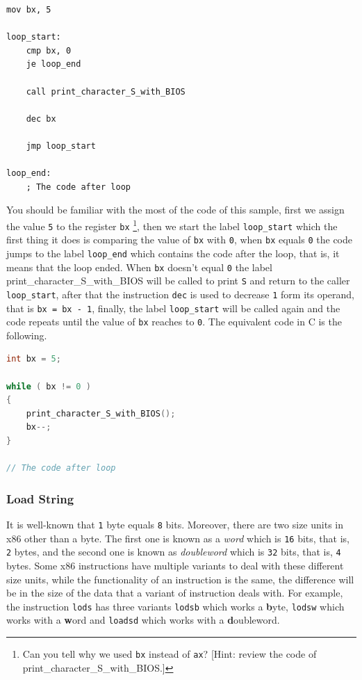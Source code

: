 \begin{lstlisting}
mov bx, 5

loop_start:
    cmp bx, 0
    je loop_end
    
    call print_character_S_with_BIOS
    
    dec bx
    
    jmp loop_start
    
loop_end:
    ; The code after loop
\end{lstlisting}

You should be familiar with the most of the code of this sample, first
we assign the value \lstinline!5! to the register \lstinline!bx!
\footnote{Can you tell why we used \lstinline!bx! instead of
  \lstinline!ax!? {[}Hint: review the code of
  print\_character\_S\_with\_BIOS.{]}}, then we start the label
\lstinline!loop_start! which the first thing it does is comparing the
value of \lstinline!bx! with \lstinline!0!, when \lstinline!bx! equals
\lstinline!0! the code jumps to the label \lstinline!loop_end! which
contains the code after the loop, that is, it means that the loop ended.
When \lstinline!bx! doesn't equal \lstinline!0! the label
print\_character\_S\_with\_BIOS will be called to print \lstinline!S!
and return to the caller \lstinline!loop_start!, after that the
instruction \lstinline!dec! is used to decrease \lstinline!1! form its
operand, that is \lstinline!bx = bx - 1!, finally, the label
\lstinline!loop_start! will be called again and the code repeats until
the value of \lstinline!bx! reaches to \lstinline!0!. The equivalent
code in C is the following.

\begin{lstlisting}[language=C]
int bx = 5;

while ( bx != 0 )
{
    print_character_S_with_BIOS();
    bx--;
}

// The code after loop
\end{lstlisting}

\subsubsection{Load String}\label{load-string}

It is well-known that \lstinline!1! byte equals \lstinline!8! bits.
Moreover, there are two size units in x86 other than a byte. The first
one is known as a \emph{word} which is \lstinline!16! bits, that is,
\lstinline!2! bytes, and the second one is known as \emph{doubleword}
which is \lstinline!32! bits, that is, \lstinline!4! bytes. Some x86
instructions have multiple variants to deal with these different size
units, while the functionality of an instruction is the same, the
difference will be in the size of the data that a variant of instruction
deals with. For example, the instruction \lstinline!lods! has three
variants \lstinline!lodsb! which works a \textbf{b}yte,
\lstinline!lodsw! which works with a \textbf{w}ord and
\lstinline!loadsd! which works with a \textbf{d}oubleword.

